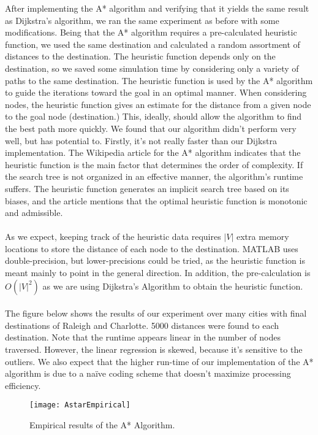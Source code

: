 \documentclass[]{../ncmathy}
\begin{document}
After implementing the A* algorithm and verifying that it yields the same result as Dijkstra's algorithm, we ran the same experiment as before with some modifications. Being that the A* algorithm requires a pre-calculated heuristic function, we used the same destination and calculated a random assortment of distances to the destination. The heuristic function depends only on the destination, so we saved some simulation time by considering only a variety of paths to the same destination. The heuristic function is used by the A* algorithm to guide the iterations toward the goal in an optimal manner. When considering nodes, the heuristic function gives an estimate for the distance from a given node to the goal node (destination.) This, ideally, should allow the algorithm to find the best path more quickly. We found that our algorithm didn't perform very well, but has potential to. Firstly, it's not really faster than our Dijkstra implementation. The Wikipedia article for the A* algorithm indicates that the heuristic function is the main factor that determines the order of complexity. If the search tree is not organized in an effective manner, the algorithm's runtime suffers. The heuristic function generates an implicit search tree based on its biases, and the article mentions that the optimal heuristic function is monotonic and admissible. 
\\\\
As we expect, keeping track of the heuristic data requires $|V|$ extra memory locations to store the distance of each node to the destination. MATLAB uses double-precision, but lower-precisions could be tried, as the heuristic function is meant mainly to point in the general direction. In addition, the pre-calculation is $O(|V|^2)$ as we are using Dijkstra's Algorithm to obtain the heuristic function. 
\\\\
The figure below shows the results of our experiment over many cities with final destinations of Raleigh and Charlotte. 5000 distances were found to each destination. Note that the runtime appears linear in the number of nodes traversed. However, the linear regression is skewed, because it's sensitive to the outliers. We also expect that the higher run-time of our implementation of the A* algorithm is due to a na\"ive coding scheme that doesn't maximize processing efficiency.

\begin{figure}[H]
\centering\texttt{[image: AstarEmpirical]}
\caption{Empirical results of the A* Algorithm.}
\end{figure}
\end{document}
